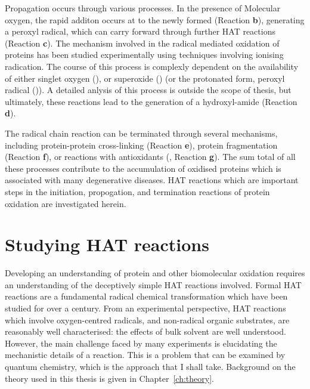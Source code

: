 Propagation occurs through various processes. In the presence of Molecular oxygen, the rapid additon occurs at to the newly formed  (Reaction \textbf{b}), generating a peroxyl radical, which can carry forward through further HAT reactions (Reaction \textbf{c}).\cite{Stadtman2003} The mechanism involved in the radical mediated oxidation of proteins has been studied experimentally using techniques involving ionising radication.\cite{Garrsion1962,Garrison1987} The course of this process is complexly dependent on the availability of either singlet oxygen (), or superoxide () (or the protonated form, peroxyl radical ()). A detailed anlysis of this process is outside the scope of thesis, but ultimately, these reactions lead to the generation of a hydroxyl-amide (Reaction \textbf{d}).

The radical chain reaction can be terminated through several mechanisms, including protein-protein cross-linking (Reaction \textbf{e}), protein fragmentation (Reaction \textbf{f}), or reactions with antioxidants (, Reaction \textbf{g}). The sum total of all these processes contribute to the accumulation of oxidised proteins which is associated with many degenerative diseases.\cite{Halliwell2006} HAT reactions which are important steps in the initiation, propogation, and termination reactions of protein oxidation are investigated herein.

\section{Studying HAT reactions}

Developing an understanding of protein and other biomolecular oxidation requires an understanding of the deceptively simple HAT reactions involved. Formal HAT reactions are a fundamental radical chemical transformation which have been studied for over a century.\cite{Kochi1973, Parsons2000} From an experimental perspective, HAT reactions which involve oxygen-centred radicals, and non-radical organic substrates, are reasonably well characterised: the effects of bulk solvent are well understood.\cite{Litwinienko2007} However, the main challenge faced by many experiments is elucidating the mechanistic details of a reaction. This is a problem that can be examined by quantum chemistry, which is the approach that I shall take. Background on the theory used in this thesis is given in Chapter~\ref{ch:theory}.

